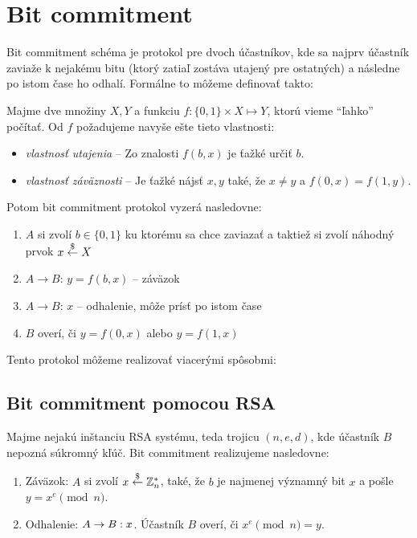 \section{Bit commitment}

Bit commitment schéma je protokol pre dvoch účastníkov, kde sa najprv účastník
zaviaže k nejakému bitu (ktorý zatiaľ zostáva utajený pre ostatných) 
a následne po istom čase ho odhalí. Formálne to môžeme definovať takto:

\begin{definicia}
    Majme dve množiny $X,Y$ a funkciu $f\colon \{0,1\} \times X \mapsto Y$,
    ktorú vieme ``ľahko'' počítať.
    Od $f$ požadujeme navyše ešte tieto vlastnosti:
    \begin{itemize}
    \item \emph{vlastnosť utajenia} --
        Zo znalosti $f(b,x)$ je ťažké určiť $b$.

    \item \emph{vlastnosť záväznosti} --
        Je ťažké nájsť $x, y$ také, že $x \neq y$ a 
            $f(0,x) = f(1,y)$.
    \end{itemize}

    Potom bit commitment protokol vyzerá nasledovne:

    \begin{enumerate}
    \item $A$ si zvolí $b \in \{0,1\}$ ku ktorému sa chce zaviazať a
            taktiež si zvolí náhodný prvok $x \overset{\$}{\leftarrow} X$
    \item $A \to B$: $y = f(b,x)$ -- záväzok
    \item $A \to B$: $x$ -- odhalenie, môže prísť po istom čase
    \item $B$ overí, či $y = f(0,x)$ alebo $y = f(1,x)$
    \end{enumerate}
\end{definicia}

\noindent
Tento protokol môžeme realizovať viacerými spôsobmi:

\subsection{Bit commitment pomocou RSA}

Majme nejakú inštanciu RSA systému, teda trojicu $(n,e,d)$,
kde účastník $B$ nepozná súkromný kľúč.
Bit commitment realizujeme nasledovne:
\begin{enumerate}
    \item Záväzok: $A$ si zvolí $x \overset{\$}{\leftarrow} \mathbb{Z}_n^*$, také, že
        $b$ je najmenej významný bit $x$ a pošle 
        $y = x^e \pmod n$.
    \item Odhalenie: $A \rightarrow B:x$. Účastník $B$ overí, či
        $x^e \pmod n = y$.
\end{enumerate}

